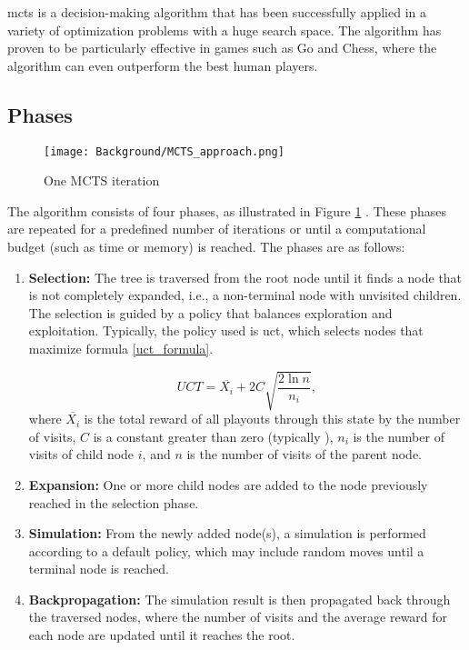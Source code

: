 \ac{mcts} is a decision-making algorithm that has been successfully applied in a variety of optimization problems with a huge search space. The algorithm has proven to be particularly effective in games such as Go and Chess, where the algorithm can even outperform the best human players.

\subsection{Phases}

\begin{figure}
      \centering
      \texttt{[image: Background/MCTS\_approach.png]}
      \caption[MCTS approach]
      {One MCTS iteration \cite{browne_survey_2012}}
      \label{fig:mcts_approach}
\end{figure}

The algorithm consists of four phases, as illustrated in Figure \ref{fig:mcts_approach}  \cite{browne_survey_2012}. These phases are repeated for a predefined number of iterations or until a computational budget (such as time or memory) is reached. The phases are as follows:

\begin{enumerate}
	\item \textbf{Selection:} The tree is traversed from the root node until it finds a node that is not completely expanded, i.e., a non-terminal node with unvisited children. The selection is guided by a policy that balances exploration and exploitation. Typically, the policy used is \ac{uct}, which selects nodes that maximize formula \ref{uct_formula}.
	 
	\begin{equation}
	UCT = \overline{X_i} + 2C\sqrt{\frac{2\ln{n}}{n_i}},\label{uct_formula}
	\end{equation} where \(\overline{X_i}\) is the total reward of all playouts through this state by the number of visits, \(C\) is a constant greater than zero (typically ), \(n_i\) is the number of visits of child node \(i\), and \(n\) is the number of visits of the parent node.
    \item \textbf{Expansion:} One or more child nodes are added to the node previously reached in the selection phase.
    \item \textbf{Simulation:} From the newly added node(s), a simulation is performed according to a default policy, which may include random moves until a terminal node is reached.
    \item \textbf{Backpropagation:} The simulation result is then propagated back through the traversed nodes, where the number of visits and the average reward for each node are updated until it reaches the root.
\end{enumerate}

